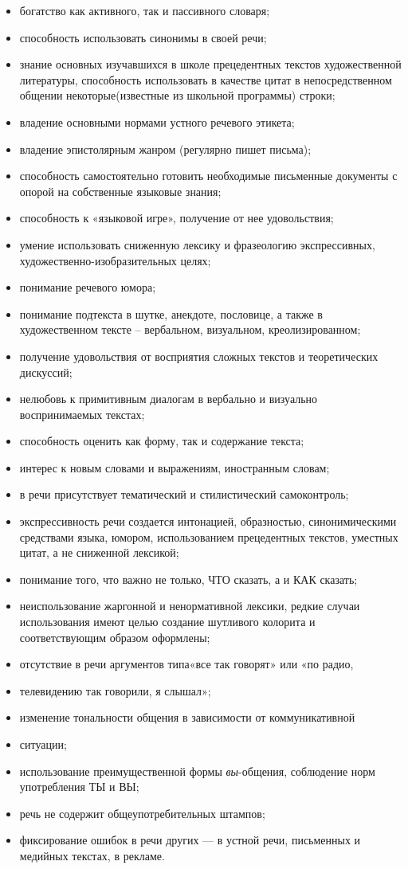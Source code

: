\begin{itemize}
    \item богатство как активного, так и пассивного словаря;
    \item способность использовать синонимы в своей речи;
    \item знание основных изучавшихся в школе прецедентных текстов художественной литературы, способность использовать в качестве цитат в непосредственном общении некоторые(известные из школьной программы) строки;
    \item владение основными нормами устного речевого этикета;
    \item владение эпистолярным жанром (регулярно пишет письма);
    \item способность самостоятельно готовить необходимые письменные документы с опорой на собственные языковые знания;
    \item способность к «языковой игре», получение от нее удовольствия;
    \item умение использовать сниженную лексику и фразеологию экспрессивных, художественно-изобразительных целях;
    \item понимание речевого юмора;
    \item понимание подтекста в шутке, анекдоте, пословице, а также в художественном тексте – вербальном, визуальном, креолизированном;
    \item получение удовольствия от восприятия сложных текстов и теоретических дискуссий;
    \item нелюбовь к примитивным диалогам в вербально и визуально воспринимаемых текстах;
    \item способность оценить как форму, так и содержание текста;
    \item интерес к новым словами и выражениям, иностранным словам;
    \item в речи присутствует тематический и стилистический самоконтроль;
    \item экспрессивность речи создается интонацией, образностью, синонимическими средствами языка, юмором, использованием прецедентных текстов, уместных цитат, а не сниженной лексикой;
    \item понимание того, что важно не только, ЧТО сказать, а и КАК сказать;
    \item неиспользование жаргонной и ненормативной лексики, редкие случаи использования имеют целью создание шутливого колорита и соответствующим образом оформлены;
    \item отсутствие в речи аргументов типа«все так говорят» или «по радио,
    \item телевидению так говорили, я слышал»;
    \item изменение тональности общения в зависимости от коммуникативной
    \item ситуации;
    \item использование преимущественной формы \textit{вы}-общения, соблюдение норм употребления ТЫ и ВЫ;
    \item речь не содержит общеупотребительных штампов;
    \item фиксирование ошибок в речи других --- в устной речи, письменных и медийных текстах, в рекламе.
\end{itemize}
